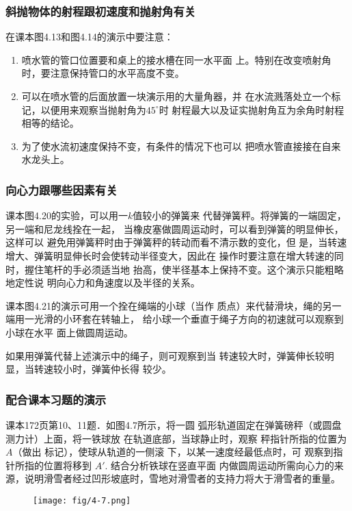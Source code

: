 \subsubsection{斜抛物体的射程跟初速度和抛射角有关}
在课本图4.13和图4.14的演示中要注意：
\begin{enumerate}
\item 喷水管的管口位置要和桌上的接水槽在同一水平面
上。特别在改变喷射角时，要注意保持管口的水平高度不变。
\item 可以在喷水管的后面放置一块演示用的大量角器，并
在水流溅落处立一个标记，以便用来观察当抛射角为$45^{\circ}$时
射程最大以及证实抛射角互为余角时射程相等的结论。
\item 为了使水流初速度保持不变，有条件的情况下也可以
把喷水管直接接在自来水龙头上。
\end{enumerate}



\subsubsection{向心力跟哪些因素有关}
课本图4.20的实验，可以用一$k$值较小的弹簧来
代替弹簧秤。将弹簧的一端固定，另一端和尼龙线拴在一起，
当橡皮塞做圆周运动时，可以看到弹簧的明显伸长，这样可以
避免用弹簧秤时由于弹簧秤的转动而看不清示数的变化，但
是，当转速增大、弹簧明显伸长时会使转动半径变大，因此在
操作时要注意在增大转速的同时，握住笔杆的手必须适当地
抬高，使半径基本上保持不变。这个演示只能粗略地定性说
明向心力和角速度以及半径的关系。

课本图4.21的演示可用一个拴在绳端的小球（当作
质点）来代替滑块，绳的另一端用一光滑的小环套在转轴上，
给小球一个垂直于绳子方向的初速就可以观察到小球在水平
面上做圆周运动。

如果用弹簧代替上述演示中的绳子，则可观察到当
转速较大时，弹簧伸长较明显，当转速较小时，弹簧仲长得
较少。

\subsubsection{配合课本习题的演示}
课本172页第10、11题．如图4.7所示，将一圆
弧形轨道固定在弹簧磅秤（或圆盘测力计）上面，将一铁球放
在轨道底部，当球静止时，观察
秤指针所指的位置为$A$（做出
标记），使球从轨道的一侧滚
下，以某一速度经最低点时，可
观察到指针所指的位置将移到
$A'$. 结合分析铁球在竖直平面
内做圆周运动所需向心力的来
源，说明滑雪者经过凹形坡底时，雪地对滑雪者的支持力将大于滑雪者的重量。

\begin{figure}[htp]
    \centering
    \texttt{[image: fig/4-7.png]}
    \caption{}
\end{figure}

